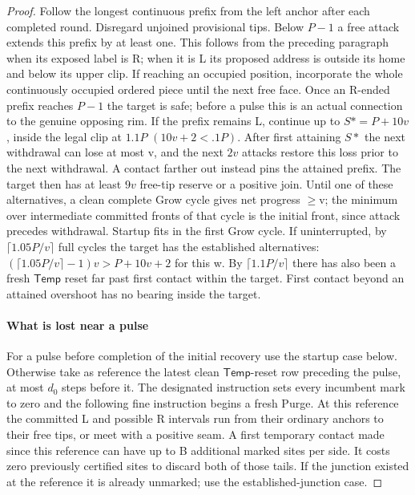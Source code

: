 \begin{proof}
Follow the longest continuous prefix from the left anchor after each completed round. Disregard unjoined provisional tips. Below \(P- 1\) a free attack extends this prefix by at least one. This follows from the preceding paragraph when its exposed label is R; when it is L its proposed address is outside its home and below its upper clip. If reaching an occupied position, incorporate the whole continuously occupied ordered piece until the next free face. Once an R-ended prefix reaches \(P- 1\) the target is safe; before a pulse this is an actual connection to the genuine opposing rim. If the prefix remains L, continue up to \(S*=P+10v\), inside the legal clip at \(1.1P\) \((10v+2<.1P)\). After first attaining \(S*\) the next withdrawal can lose at most v, and the next \(2v\) attacks restore this loss prior to the next withdrawal. A contact farther out instead pins the attained prefix. The target then has at least \(9v\) free-tip reserve or a positive join. Until one of these alternatives, a clean complete Grow cycle gives net progress \(\ge\)v; the minimum over intermediate committed fronts of that cycle is the initial front, since attack precedes withdrawal. Startup fits in the first Grow cycle. If uninterrupted, by \(\lceil 1.05P/v \rceil \) full cycles the target has the established alternatives: \((\lceil 1.05P/v \rceil - 1)v>P+10v+2\) for this w. By \(\lceil 1.1P/v \rceil \) there has also been a fresh \(\mathsf{Temp}\) reset far past first contact within the target. First contact beyond an attained overshoot has no bearing inside the target.

\paragraph{What is lost near a pulse}

For a pulse before completion of the initial recovery use the startup case below. Otherwise take as reference the latest clean \(\mathsf{Temp}\)-reset row preceding the pulse, at most \(d_0\) steps before it. The designated instruction sets every incumbent mark to zero and the following fine instruction begins a fresh Purge. At this reference the committed L and possible R intervals run from their ordinary anchors to their free tips, or meet with a positive seam. A first temporary contact made since this reference can have up to B additional marked sites per side. It costs zero previously certified sites to discard both of those tails. If the junction existed at the reference it is already unmarked; use the established-junction case.


\end{proof}
